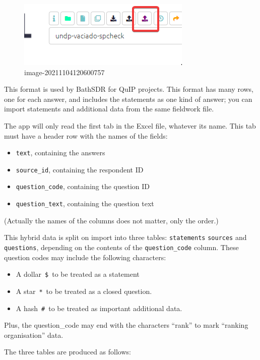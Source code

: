 \documentclass[
]{book}
\providecommand{\tightlist}{%
  \setlength{\itemsep}{0pt}\setlength{\parskip}{0pt}}
\begin{document}
\begin{figure}
\centering
\includegraphics{_assets/image-20211104120600757.png}
\caption{image-20211104120600757}
\end{figure}

This format is used by BathSDR for QuIP projects. This format has many rows, one for each answer, and includes the statements as one kind of answer; you can import statements and additional data from the same fieldwork file.

The app will only read the first tab in the Excel file, whatever its name. This tab must have a header row with the names of the fields:

\begin{itemize}
\tightlist
\item
  \texttt{text}, containing the answers
\item
  \texttt{source\_id}, containing the respondent ID
\item
  \texttt{question\_code}, containing the question ID
\item
  \texttt{question\_text}, containing the question text
\end{itemize}

(Actually the names of the columns does not matter, only the order.)

This hybrid data is split on import into three tables: \texttt{statements} \texttt{sources} and \texttt{questions}, depending on the contents of the \texttt{question\_code} column. These question codes may include the following characters:

\begin{itemize}
\item
  A dollar~\texttt{\$}~to be treated as a statement
\item
  A star~\texttt{*}~to be treated as a closed question.
\item
  A hash~\texttt{\#}~to be treated as important additional data.
\end{itemize}

Plus, the question\_code may end with the characters ``rank'' to mark ``ranking organisation'' data.

The three tables are produced as follows:
\end{document}
